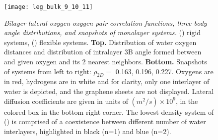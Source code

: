 \documentclass[12pt]{article}
\begin{document}
\begin{figure}[ht!]
	\centering
	\texttt{[image: leg\_bulk\_9\_10\_11]}\\
	\caption{\textit{Bilayer lateral oxygen-oxygen pair correlation functions, three-body angle distributions, and snapshots of monolayer systems.} (\protect{}) rigid systems, (\protect{}) flexible systems. \textbf{Top.} Distribution of water oxygen distances and distribution of intralayer 3B angle formed between and given oxygen and its 2 nearest neighbors. \textbf{Bottom.} Snapshots of systems from left to right: \(\rho_{2D}=\) 0.163, 0.196, 0.227. Oxygens are in red, hydrogens are in white and for clarity, only one interlayer of water is depicted, and the graphene sheets are not displayed. Lateral diffusion coefficients are given in units of \((m^2/s) \times 10^9\), in the colored box in the bottom right corner. The lowest density system of (\protect{}) is comprised of a coexistence between different number of water interlayers, highlighted in black (n=1) and blue (n=2).}
	\label{fig:struct_9_10_11}
\end{figure}
\end{document}

